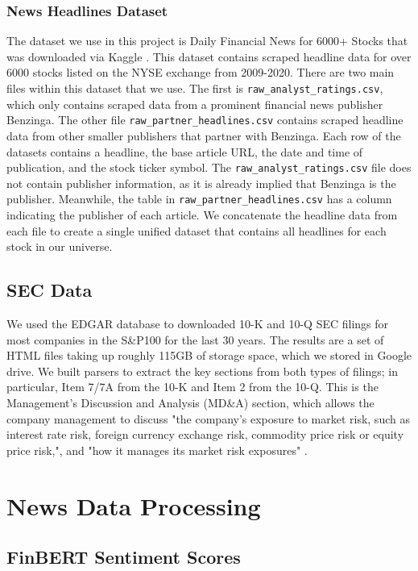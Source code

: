 \subsubsection{News Headlines Dataset}
The dataset we use in this project is Daily Financial News for 6000+ Stocks that was downloaded via Kaggle \cite{financial_news}.
This dataset contains scraped headline data for over 6000 stocks listed on the NYSE exchange from 2009-2020. 
There are two main files within this dataset that we use. The first is \texttt{raw\_analyst\_ratings.csv}, which only contains scraped data from a prominent financial news publisher Benzinga.
The other file \texttt{raw\_partner\_headlines.csv} contains scraped headline data from other smaller publishers that partner with Benzinga. Each row of the datasets contains a headline, the base article URL, the date and time of publication, and the stock ticker symbol.
The \texttt{raw\_analyst\_ratings.csv} file does not contain publisher information, as it is already implied that Benzinga is the publisher. Meanwhile, the table in \texttt{raw\_partner\_headlines.csv} has a column indicating the publisher of each article. 
We concatenate the headline data from each file to create a single unified dataset that contains all headlines for each stock in our universe.

\subsection{SEC Data}
We used the EDGAR database to downloaded 10-K and 10-Q SEC filings for most companies in the S\&P100 for the last 30 years.
The results are a set of HTML files taking up roughly 115GB of storage space, which we stored in Google drive.
We built parsers to extract the key sections from both types of filings; in particular, Item 7/7A from the 10-K and Item 2 from the 10-Q.
This is the Management’s Discussion and Analysis (MD\&A) section, which allows the company management to discuss
"the company’s exposure to market risk, such as interest rate risk, foreign currency exchange risk, commodity price risk or equity price risk,", and "how it manages its market risk exposures" \cite{sec_how_to_read_10kq}.



\section{News Data Processing}

\subsection{FinBERT Sentiment Scores}\label{finbert}

